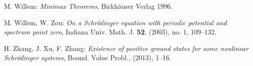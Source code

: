 \documentclass{scrartcl}
\numberwithin{equation}{section}
\begin{document}
\begin{thebibliography}{99}
 M. Willem: {\em Minimax Theorems}, Birkh\"auser Verlag 1996.

 M. Willem, W. Zou: {\em On a Schr\"odinger equation with periodic potential and spectrum point zero}, Indiana Univ. Math. J. \textbf{52}, (2003), no. 1, 109--132.


 H. Zhang, J. Xu, F. Zhang: {\em Existence of positive ground states for some nonlinear Schr\"{o}dinger systems}, Bound. Value Probl., (2013), 1--16.

\end{thebibliography}


 
\end{document}
